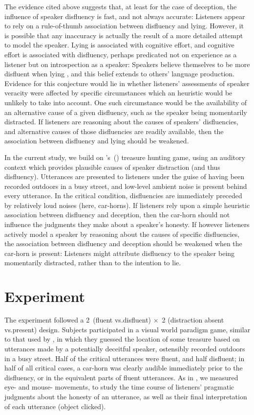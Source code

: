 \documentclass[a4paper,man,natbib]{apa6}
\newcommand*{\citegen}[1]{\citeauthor{#1}'s~(\citeyear{#1})}
\begin{document}
The evidence cited above suggests that, at least for the case of deception, the influence of speaker disfluency is fast, and not always accurate: 
Listeners appear to rely on a rule-of-thumb association between disfluency and lying.
However, it is possible that any inaccuracy is actually the result of a more detailed attempt to model the speaker.
Lying is associated with cognitive effort, and cognitive effort is associated with disfluency, perhaps predicated not on experience as a listener but on introspection as a speaker:
Speakers believe themselves to be more disfluent when lying \citep{Zuckerman1981}, and this belief extends to others' language production.
Evidence for this conjecture would lie in whether listeners' assessments of speaker veracity were affected by specific circumstances which an heuristic would be unlikely to take into account.
One such circumstance would be the availability of an alternative cause of a given disfluency, such as the speaker being momentarily distracted.
If listeners are reasoning about the causes of speakers' disfluencies, and alternative causes of those disfluencies are readily available, then the association between disfluency and lying should be weakened.


In the current study, we build on \citegen{Loy2016} treasure hunting game, using an auditory context which provides plausible causes of speaker distraction (and thus disfluency).
Utterances are presented to listeners under the guise of having been recorded outdoors in a busy street, and low-level ambient noise is present behind every utterance.
In the critical condition, disfluencies are immediately preceded by relatively loud noises (here, car-horns).
If listeners rely upon a simple heuristic association between disfluency and deception, then the car-horn should not influence the judgments they make about a speaker's honesty.
If however listeners actively model a speaker by reasoning about the causes of specific disfluencies, the association between disfluency and deception should be weakened when the car-horn is present:
Listeners might attribute disfluency to the speaker being momentarily distracted, rather than to the intention to lie.


\section{Experiment}

The experiment followed a 2~(fluent vs.\@ disfluent) $\times$~2 (distraction absent vs.\@ present) design.
Subjects participated in a visual world paradigm game, similar to that used by \citet{Loy2016}, in which they guessed the location of some treasure based on utterances made by a potentially deceitful speaker, ostensibly recorded outdoors in a busy street.
Half of the critical utterances were fluent, and half disfluent; in half of all critical cases, a car-horn was clearly audible immediately prior to the disfluency, or in the equivalent parts of fluent utterances.
As in \citet{Loy2016}, we measured eye- and mouse- movements, to study the time course of listeners' pragmatic judgments about the honesty of an utterance, as well as their final interpretation of each utterance (object clicked).
\end{document}
